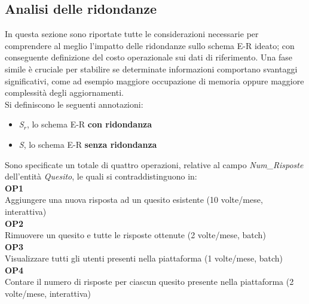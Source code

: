 \documentclass{article}
\begin{document}
\subsection{Analisi delle ridondanze}
\large
In questa sezione sono riportate tutte le considerazioni necessarie per comprendere al meglio l'impatto delle ridondanze sullo schema E-R ideato; con conseguente definizione del costo operazionale sui dati di riferimento. Una fase simile è cruciale per stabilire se determinate informazioni comportano svantaggi significativi, come ad esempio maggiore occupazione di memoria oppure maggiore complessità degli aggiornamenti.\vspace{7pt}\\
Si definiscono le seguenti annotazioni:
\begin{itemize}[label={-}]
    \itemsep0em
    \item \textit{S$_r$}, lo schema E-R \textbf{con ridondanza}
    \item \textit{S}, \hspace{1px} lo schema E-R \textbf{senza ridondanza}
\end{itemize}
\vspace*{7pt}
Sono specificate un totale di quattro operazioni, relative al campo \textit{Num\_Risposte} dell'entità \textit{Quesito}, le quali si contraddistinguono in: \vspace*{7pt}\\
\hspace*{5pt}\textbf{OP1} \\
\hspace*{5pt}Aggiungere una nuova risposta ad un quesito esistente (10 volte/mese, interattiva) \vspace*{7pt}\\
\hspace*{5pt}\textbf{OP2} \\
\hspace*{5pt}Rimuovere un quesito e tutte le risposte ottenute (2 volte/mese, batch) \vspace*{7pt}\\
\hspace*{5pt}\textbf{OP3} \\
\hspace*{5pt}Visualizzare tutti gli utenti presenti nella piattaforma (1 volte/mese, batch) \vspace*{7pt}\\
\hspace*{5pt}\textbf{OP4} \\
\hspace*{5pt}Contare il numero di risposte per ciascun quesito presente nella piattaforma (2 volte/mese, \hspace*{6pt}interattiva) \vspace*{7pt}\\
\end{document}
